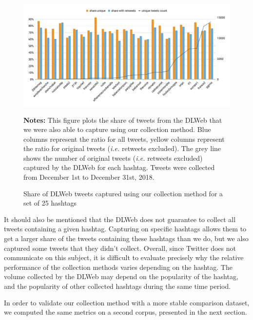 \begin{figure}
\begin{center}
\includegraphics[width=1\textwidth]{figures/ShareinCommonWithDL.pdf}
\end{center}
\scriptsize \textbf{Notes:} This figure plots the share of tweets from the DLWeb that we were also able to capture using our collection method. Blue columns represent the ratio for all tweets, yellow columns represent the ratio for original tweets (\textit{i.e.} retweets excluded). The grey line shows the number of original tweets (\textit{i.e.} retweets excluded) captured by the DLWeb for each hashtag. Tweets were collected from December 1st to December 31st, 2018.

\caption{Share of DLWeb tweets captured using our collection method for a set of 25 hashtags}
\label{Figure:HistogramHashtagsDLWeb}
\end{figure}

It should also be mentioned that the DLWeb does not guarantee to collect all tweets containing a given hashtag. Capturing on specific hashtags allows them to get a larger share of the tweets containing these hashtags than we do, but we also captured some tweets that they didn't collect. Overall, since Twitter does not communicate on this subject, it is difficult to evaluate precisely why the relative performance of the collection methods varies depending on the hashtag. The volume collected by the DLWeb may depend on the popularity of the hashtag, and the popularity of other collected hashtags during the same time period. 

In order to validate our collection method with a more stable comparison dataset, we computed the same metrics on a second corpus, presented in the next section.

